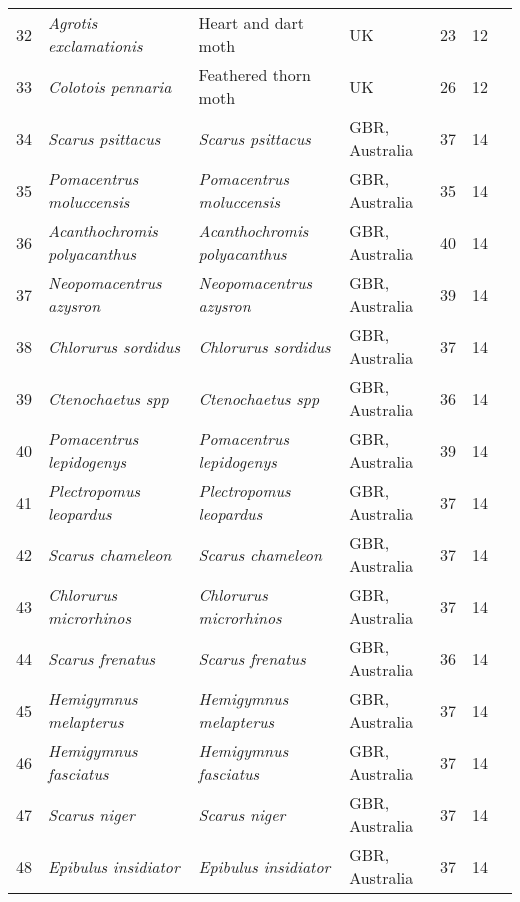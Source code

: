 \begin{table}[ht]
\begin{center}
{\begin{tabular}{rlllrrl}
   32 & \textit{Agrotis exclamationis} & Heart and dart moth & UK &  23 &  12 & \citep{conrad2004} \\
   33 & \textit{Colotois pennaria} & Feathered thorn moth & UK &  26 &  12 & \citep{conrad2004} \\
   34 & \textit{Scarus psittacus} & \textit{Scarus psittacus} & GBR, Australia &  37 &  14 & \citep{sweatman2008} \\
   35 & \textit{Pomacentrus moluccensis} & \textit{Pomacentrus moluccensis} & GBR, Australia &  35 &  14 & \citep{sweatman2008} \\
   36 & \textit{Acanthochromis polyacanthus} & \textit{Acanthochromis polyacanthus} & GBR, Australia &  40 &  14 & \citep{sweatman2008} \\
   37 & \textit{Neopomacentrus azysron} & \textit{Neopomacentrus azysron} & GBR, Australia &  39 &  14 & \citep{sweatman2008} \\
   38 & \textit{Chlorurus sordidus} & \textit{Chlorurus sordidus} & GBR, Australia &  37 &  14 & \citep{sweatman2008} \\
   39 & \textit{Ctenochaetus spp} & \textit{Ctenochaetus spp} & GBR, Australia &  36 &  14 & \citep{sweatman2008} \\
   40 & \textit{Pomacentrus lepidogenys} & \textit{Pomacentrus lepidogenys} & GBR, Australia &  39 &  14 & \citep{sweatman2008} \\
   41 & \textit{Plectropomus leopardus} & \textit{Plectropomus leopardus} & GBR, Australia &  37 &  14 & \citep{sweatman2008} \\
   42 & \textit{Scarus chameleon} & \textit{Scarus chameleon} & GBR, Australia &  37 &  14 & \citep{sweatman2008} \\
   43 & \textit{Chlorurus microrhinos} & \textit{Chlorurus microrhinos} & GBR, Australia &  37 &  14 & \citep{sweatman2008} \\
   44 & \textit{Scarus frenatus} & \textit{Scarus frenatus} & GBR, Australia &  36 &  14 & \citep{sweatman2008} \\
   45 & \textit{Hemigymnus melapterus} & \textit{Hemigymnus melapterus} & GBR, Australia &  37 &  14 & \citep{sweatman2008} \\
   46 & \textit{Hemigymnus fasciatus} & \textit{Hemigymnus fasciatus} & GBR, Australia &  37 &  14 & \citep{sweatman2008} \\
   47 & \textit{Scarus niger} & \textit{Scarus niger} & GBR, Australia &  37 &  14 & \citep{sweatman2008} \\
   48 & \textit{Epibulus insidiator} & \textit{Epibulus insidiator} & GBR, Australia &  37 &  14 & \citep{sweatman2008} \\

\end{tabular}}
\end{center}
\end{table}
